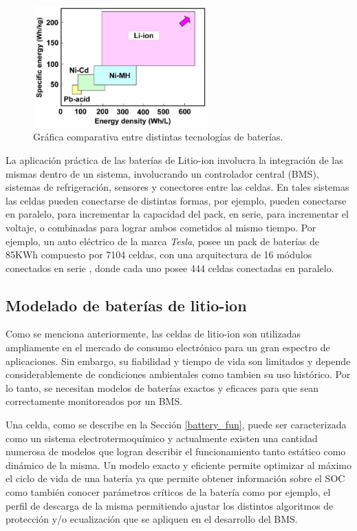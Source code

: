 \documentclass[10pt,a4paper]{article}
\begin{document}
\begin{figure}[h!]
    \begin{center}
	\includegraphics[width=0.6\textwidth]{comparisson-liion.png}
	\caption{Gr\'afica comparativa entre distintas tecnologías de baterías.}
	\label{comparisson_batt}
    \end{center}
\end{figure}

\noindent La aplicación práctica de las baterías de Litio-ion involucra la
integración de las mismas dentro de un sistema, involucrando un controlador
central (\acrshort{BMS}), sistemas de refrigeración, sensores y conectores entre
las celdas. En tales sistemas las celdas pueden conectarse de distintas formas,
por ejemplo, pueden conectarse en paralelo, para incrementar la capacidad del
pack, en serie, para incrementar el voltaje, o combinadas para lograr ambos
cometidos al mismo tiempo. Por ejemplo, un auto eléctrico de la marca
\emph{Tesla}, posee un pack de baterías de 85KWh compuesto por 7104 celdas, con
una arquitectura de 16 módulos conectados en serie , donde cada uno posee 444
celdas conectadas en paralelo.

\newpage

\subsection{Modelado de bater\'ias de litio-ion}\label{litioModel}

\noindent Como se menciona anteriormente, las celdas de litio-ion son utilizadas
ampliamente en el mercado de consumo electr\'onico para un gran espectro de 
aplicaciones. Sin embargo, su fiabilidad y tiempo de vida son limitados y 
depende considerablemente de condiciones ambientales como tambien su uso 
hist\'orico. Por lo tanto, se necesitan modelos de bater\'ias exactos y eficaces 
para que sean correctamente monitoreados por un \acrshort{BMS}.

\noindent Una celda, como se describe en la Secci\'on \ref{battery_fun}, puede 
ser caracterizada como un sistema electrotermoqu\'imico y actualmente existen 
una cantidad numerosa de modelos que logran describir el funcionamiento tanto 
est\'atico como din\'amico de la misma. Un modelo exacto y eficiente permite 
optimizar al m\'aximo el ciclo de vida de una bater\'ia ya que permite 
obtener informaci\'on sobre el \acrshort{SOC} como tambi\'en conocer 
par\'ametros cr\'iticos de la bater\'ia como por ejemplo, el perfil de descarga 
de la misma permitiendo ajustar los distintos algoritmos de protecci\'on y/o 
ecualizaci\'on  que se apliquen en el desarrollo del \acrshort{BMS}.
\end{document}
